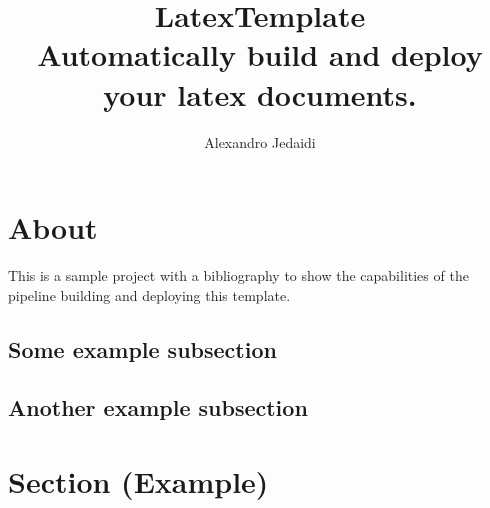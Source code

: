 \documentclass[
    paper=a4, %
    fontsize=10pt,  %
    oneside,        %
    headsepline,    %
    notitlepage     %
]{extarticle}         %
\author{Alexandro Jedaidi}
\title{\textbf{LatexTemplate}\\\large{Automatically build and deploy your latex documents.}}
\date{}
\begin{document}
    \pagestyle{empty}
    \maketitle
    \tableofcontents
    \newpage
    \pagestyle{headings}

    \section{About}
    This is a sample project with a bibliography to show the capabilities of the pipeline building and deploying this template.\cite{Google}

    \subsection{Some example subsection}
    \subsection{Another example subsection}

    \section{Section (Example)}

    \newpage
    \printbibliography[heading=bibintoc]
    \newpage
    \listoffigures
\end{document}
